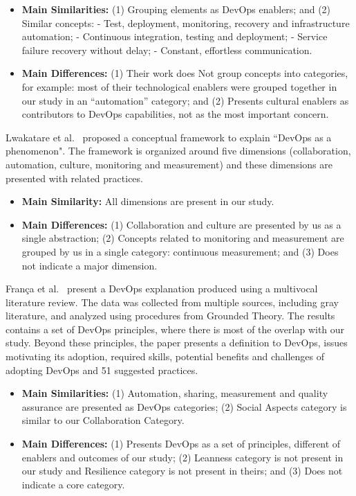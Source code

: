 \begin{itemize}
\item \textbf{Main Similarities:}
  (1) Grouping elements as DevOps enablers; and
  (2) Similar concepts:\newline
    - Test, deployment, monitoring, recovery and infrastructure automation;\newline
    - Continuous integration, testing and deployment;\newline
    - Service failure recovery without delay;\newline
    - Constant, effortless communication.\newline
\item \textbf{Main Differences:}
(1) Their work does Not group concepts into categories, for example: most of their technological enablers
were grouped together in our study in an ``automation” category; and (2) Presents
cultural enablers as contributors to DevOps capabilities, not as the most
important concern.
\end{itemize}

Lwakatare et al.~\cite{extending_dimensions_icsea_16} proposed a conceptual
framework to explain ``DevOps as a phenomenon". The framework is organized around
five dimensions (collaboration, automation, culture, monitoring and measurement)
and these dimensions are presented with related practices.
\begin{itemize}
\item \textbf{Main Similarity:}
  All dimensions are present in our study.

\item \textbf{Main Differences:}
  (1) Collaboration and culture are presented by us as a single abstraction;
  (2) Concepts related to monitoring and measurement are grouped by us in a single
  category: continuous measurement; and (3) Does not indicate a major dimension.
\end{itemize}

Fran\c{c}a et al.~\cite{characterizing_devops_sbes_2016} present a DevOps
explanation produced using a multivocal literature review. The data was collected
from multiple sources, including gray literature, and analyzed using procedures
from Grounded Theory. The results contains a set of DevOps principles, where
there is most of the overlap with our study. Beyond these principles, the paper
presents a definition to DevOps, issues motivating its adoption, required skills,
potential benefits and challenges of adopting DevOps and 51 suggested practices.
\begin{itemize}
\item \textbf{Main Similarities:}
  (1) Automation, sharing, measurement and quality assurance are presented as DevOps
  categories;
  (2) Social Aspects category is similar to our Collaboration Category.

\item \textbf{Main Differences:}
  (1) Presents DevOps as a set of principles, different of enablers and outcomes of
  our study;
  (2) Leanness category is not present in our study and Resilience category is not
  present in theirs; and (3) Does not indicate a core category.

\end{itemize}

